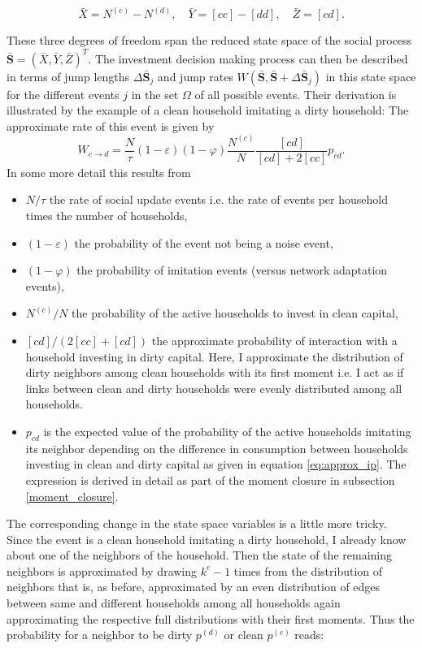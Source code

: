 \begin{equation}
	\bar{X} = N^{(c)} - N^{(d)}, \quad \bar{Y} = [cc] - [dd], \quad \bar{Z} = [cd].
	\label{eq:opinion_formation_macro_variables}
\end{equation}

These three degrees of freedom span the reduced state space of the social process $\mathbf{\bar{S}} = (\bar{X}, \bar{Y}, \bar{Z})^T$. The investment decision making process can then be described in terms of jump lengths $\Delta \mathbf{\bar{S}}_j$ and jump rates $W(\mathbf{\bar{S}},\mathbf{\bar{S}} + \Delta \mathbf{\bar{S}}_j)$ in this state space for the different events $j$ in the set $\Omega$ of all possible events.
Their derivation is illustrated by the example of a clean household imitating a dirty household: The approximate rate of this event is given by
\begin{equation}
	W_{c \rightarrow d} = \frac{N}{\tau} (1-\varepsilon) (1 - \varphi) \frac{N^{(c)}}{N}\frac{[cd]}{[cd] + 2 [cc]}p_{cd}.
	\label{eq:cdswitchingprob}
\end{equation}
In some more detail this results from
\begin{itemize}
	\item $N/\tau$ the rate of social update events i.e. the rate of events per household times the number of households,
	\item $(1-\varepsilon)$ the probability of the event not being a noise event,
	\item $(1-\varphi)$ the probability of imitation events (versus network adaptation events),
	\item $N^{(c)}/N$ the probability of the active households to invest in clean capital,
	\item $[cd]/(2[cc] + [cd])$ the approximate probability of interaction with a household investing in dirty capital. Here, I approximate the distribution of dirty neighbors among clean households with its first moment i.e. I act as if links between clean and dirty households were evenly distributed among all households. 
	\item $p_{cd}$ is the expected value of the probability of the active households imitating its neighbor depending on the difference in consumption between households investing in clean and dirty capital as given in equation \eqref{eq:approx_ip}. The expression is derived in detail as part of the moment closure in subsection \ref{moment_closure}.
\end{itemize}
The corresponding change in the state space variables is a little more tricky. Since the event is a clean household imitating a dirty household, I already know about one of the neighbors of the household. Then the state of the remaining neighbors is approximated by drawing $k^{c} - 1$ times from the distribution of neighbors that is, as before, approximated by an even distribution of edges between same and different households among all households again approximating the respective full distributions with their first moments. Thus the probability for a neighbor to be dirty $p^{(d)}$ or clean $p^{(c)}$ reads:
